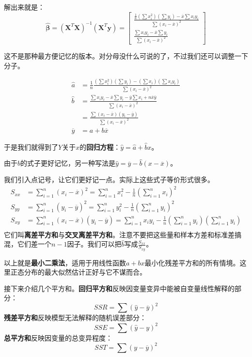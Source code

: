 解出来就是：
\[
\hat{\boldsymbol{\beta}} = (\mathbf{X}^T \mathbf{X})^{-1}(\mathbf{X}^T \mathbf{y})=
\begin{bmatrix}
  \frac{\frac{1}{n}(\sum x_i^2)(\sum y_i)-\overline{x}\sum x_iy_i}{\sum(x_i-\overline{x})^2}  \\
  \frac{\sum x_iy_i -\overline{x}\sum y_i}{\sum(x_i-\overline{x})^2}
\end{bmatrix}
\]

这不是那种最方便记忆的版本。对分母没什么可说的了，不过我们还可以调整一下分子。

\begin{align*}
\hat{a} &= \frac{1}{n}\frac{(\sum x_i^2)(\sum y_i)-(\sum x_i)\left(\sum x_iy_i\right)}{\sum(x_i-\overline{x})^2} \\
\hat{b} &= \frac{\sum x_iy_i -\overline{x}\sum y_i -\overline{y}\sum x_i + n\overline{x}\overline{y}}{\sum(x_i-\overline{x})^2} \\
&= \frac{\sum (x_i-\overline{x})(y_i-\overline{y})}{\sum(x_i-\overline{x})^2}\\
\overline{y} &= a+b\overline{x}
\end{align*}

于是我们就得到了$Y$关于$x$的\textbf{回归方程}：$\hat{y}=\hat{a}+\hat{b}x$。

由于$\hat{b}$的式子更好记忆，另一种写法是$\hat{y} = \overline{y} - \hat{b}(x-\overline{x})$。

我们引入点记号，让它们更好记一点。实际上这些式子等价形式很多。
\begin{align*}
S_{xx} &= \sum_{i=1}^n (x_i-\overline{x})^2 = \sum_{i=1}^n x_i^2 - \frac{1}{n}(\sum_{i=1}^n x_i)^2 \\
S_{yy} &= \sum_{i=1}^n (y_i-\overline{y})^2 = \sum_{i=1}^n y_i^2 - \frac{1}{n}(\sum_{i=1}^n y_i)^2 \\
S_{xy} &= \sum_{i=1}^n (x_i-\overline{x})(y_i-\overline{y}) = \sum_{i=1}^n x_iy_i - \frac{1}{n}(\sum_{i=1}^n y_i)(\sum_{i=1}^n y_i) \\
\end{align*}
它们叫\textbf{离差平方和}与\textbf{交叉离差平方和}。注意不要把这些量和样本方差和标准差搞混，它们差一个$n-1$因子。我们可以把$\hat{b}$写成$\frac{S_{xx}}{S_{xy}}$。

以上就是\textbf{最小二乘法}，适用于用线性函数$a+bx$最小化残差平方和的所有情境。这里正态分布的最大似然估计正好与它不谋而合。

接下来介绍几个平方和。\textbf{回归平方和}反映因变量变异中能被自变量线性解释的部分：
\[
SSR=\sum (\hat{y}-\overline{y})^2
\]
\textbf{残差平方和}反映模型无法解释的随机误差部分：
\[
SSE = \sum (\hat{y}-y)^2
\]
\textbf{总平方和}反映因变量的总变异程度：
\[
SST = \sum (y-\overline{y})^2
\]

